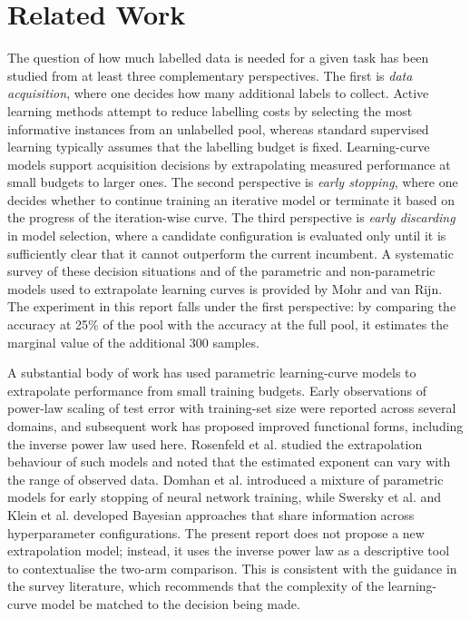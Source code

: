 \documentclass{article}
\begin{document}
\section{Related Work}
\label{sec:related}

The question of how much labelled data is needed for a given task has been studied from at least three complementary perspectives. The first is \emph{data acquisition}, where one decides how many additional labels to collect. Active learning methods attempt to reduce labelling costs by selecting the most informative instances from an unlabelled pool, whereas standard supervised learning typically assumes that the labelling budget is fixed. Learning-curve models support acquisition decisions by extrapolating measured performance at small budgets to larger ones. The second perspective is \emph{early stopping}, where one decides whether to continue training an iterative model or terminate it based on the progress of the iteration-wise curve. The third perspective is \emph{early discarding} in model selection, where a candidate configuration is evaluated only until it is sufficiently clear that it cannot outperform the current incumbent. A systematic survey of these decision situations and of the parametric and non-parametric models used to extrapolate learning curves is provided by Mohr and van Rijn. The experiment in this report falls under the first perspective: by comparing the accuracy at 25\% of the pool with the accuracy at the full pool, it estimates the marginal value of the additional 300 samples.

A substantial body of work has used parametric learning-curve models to extrapolate performance from small training budgets. Early observations of power-law scaling of test error with training-set size were reported across several domains, and subsequent work has proposed improved functional forms, including the inverse power law used here. Rosenfeld et al. studied the extrapolation behaviour of such models and noted that the estimated exponent can vary with the range of observed data. Domhan et al. introduced a mixture of parametric models for early stopping of neural network training, while Swersky et al. and Klein et al. developed Bayesian approaches that share information across hyperparameter configurations. The present report does not propose a new extrapolation model; instead, it uses the inverse power law as a descriptive tool to contextualise the two-arm comparison. This is consistent with the guidance in the survey literature, which recommends that the complexity of the learning-curve model be matched to the decision being made.
\end{document}
